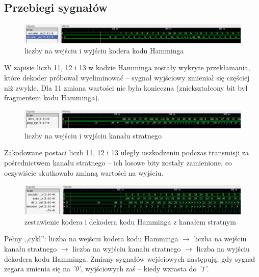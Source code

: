 \documentclass[a4paper,11pt]{article}
\begin{document}
  \subsection{Przebiegi sygnałów}
  \begin{figure}[H]
    \includegraphics[width=1.2\textwidth,center]{gtk1.png}
    \caption{liczby na wejściu i wyjściu kodera kodu Hamminga}
  \end{figure}
  W zapisie liczb 11, 12 i 13 w kodzie Hamminga zostały wykryte przekłamania, które dekoder próbował wyeliminować -- sygnał wyjściowy zmieniał się częściej niż zwykle. Dla 11 zmiana wartości nie była konieczna (zniekształcony bit był fragmentem kodu Hamminga).
  \begin{figure}[H]
    \includegraphics[width=1.2\textwidth,center]{gtk2.png}
    \caption{liczby na wejściu i wyjściu kanału stratnego}
  \end{figure}
  Zakodowane postaci liczb 11, 12 i 13 uległy uszkodzeniu podczas transmisji za pośrednictwem kanału stratnego -- ich losowe bity zostały zamienione, co oczywiście skutkowało zmianą wartości na wyjściu.
  \begin{figure}[H]
    \includegraphics[width=1.2\textwidth,center]{gtk3.png}
    \caption{zestawienie kodera i dekodera kodu Hamminga z kanałem stratnym}
  \end{figure}
  Pełny ,,cykl'': liczba na wejściu kodera kodu Hamminga $\rightarrow$ liczba na wejściu kanału stratnego $\rightarrow$ liczba na wyjściu kanału stratnego $\rightarrow$ liczba na wyjściu dekodera kodu Hamminga. Zmiany sygnałów wejściowych następują, gdy sygnał zegara zmienia się na \textit{'0'}, wyjściowych zaś -- kiedy wzrasta do \textit{'1'}.
\end{document}
